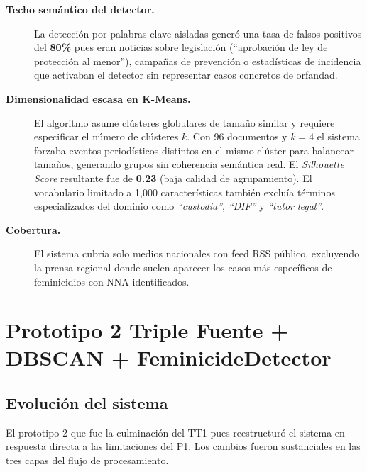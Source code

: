 \begin{description}
    \item[\textbf{Techo semántico del detector.}] La detección por palabras clave
          aisladas generó una tasa de falsos positivos del \textbf{80\%} pues eran noticias
          sobre legislación (``aprobación de ley de protección al menor''), campañas
          de prevención o estadísticas de incidencia que activaban el detector sin
          representar casos concretos de orfandad.

    \item[\textbf{Dimensionalidad escasa en K-Means.}] El algoritmo asume
          clústeres globulares de tamaño similar y requiere especificar el número de
          clústeres $k$. Con 96 documentos y $k=4$ el sistema forzaba eventos
          periodísticos distintos en el mismo clúster para balancear tamaños,
          generando grupos sin coherencia semántica real. El \textit{Silhouette
          Score} resultante fue de \textbf{0.23} (baja calidad de agrupamiento).
          El vocabulario limitado a 1{,}000 características también excluía
          términos especializados del dominio como \textit{``custodia''},
          \textit{``DIF''} y \textit{``tutor legal''}.

    \item[\textbf{Cobertura.}] El sistema cubría solo medios
          nacionales con feed RSS público, excluyendo la prensa regional donde
          suelen aparecer los casos más específicos de feminicidios con NNA
          identificados.
\end{description}


\section{Prototipo 2 Triple Fuente + DBSCAN + FeminicideDetector}
\label{sec:p2_culminacion}


\subsection{Evolución del sistema}
\label{subsec:p2_evolucion}

El prototipo 2 que fue la culminación del TT1 pues reestructuró
el sistema en respuesta directa a las limitaciones del P1. Los cambios fueron
sustanciales en las tres capas del flujo de procesamiento.

